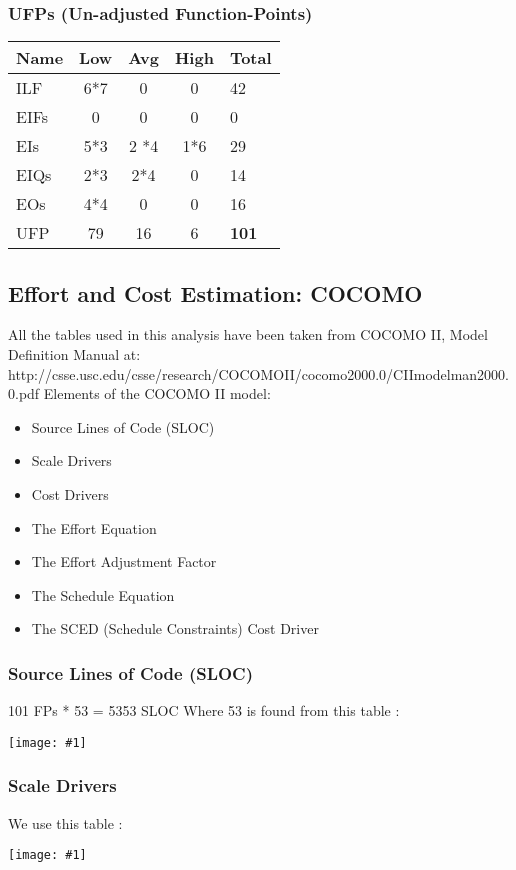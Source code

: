 \documentclass[11pt, a4paper,titlepage]{article}
\newcommand{\image}[1]{
	\begin{center}
		\noindent \texttt{[image: \#1]}
	\end{center}
}
\begin{document}
		\subsubsection{UFPs (Un-adjusted Function-Points)}
		\begin{tabularx}{\textwidth}{|X|c|c|c|l|}
			\hline
			\textbf{Name} &	\textbf{Low} & \textbf{Avg} & \textbf{High} & \textbf{Total}\\
			\hline
			ILF &	6*7 &	0 &	0 &	42 \\
			EIFs & 0  &	0 &	0 &	0 \\
			EIs & 5*3 & 2 *4 & 1*6 & 29 \\
			EIQs & 2*3 & 2*4 & 0 & 14 \\
			EOs & 4*4 & 0 & 0 & 16 \\
			\hline
			UFP & 79 & 16 & 6 & \textbf{101} \\			
			\hline
		\end{tabularx}
		\newpage
		\subsection{Effort and Cost Estimation: COCOMO}
		All the tables used in this analysis have been taken from COCOMO II, Model Definition
		Manual at:
		\newline
		http://csse.usc.edu/csse/research/COCOMOII/cocomo2000.0/CII\textunderscore modelman2000.0.pdf
		\newline
		Elements of the COCOMO II model:
		\begin{itemize}
			\item Source Lines of Code (SLOC)
			\item Scale Drivers
			\item Cost Drivers
			\item The Effort Equation
			\item The Effort Adjustment Factor
			\item The Schedule Equation
			\item The SCED (Schedule Constraints) Cost Driver
		\end{itemize}
	    \subsubsection{Source Lines of Code (SLOC)}
		
		101 FPs * 53 = 5353  SLOC
		\newline
		Where 53 is found from this table :
		\image{Co_ufp.png}
		\subsubsection{Scale Drivers}
		We use this table :
		\image{Scale_factor.png}
		
\end{document}

